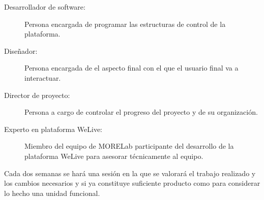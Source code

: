 \documentclass{DeustoFDP}
\begin{document}
\begin{description}
    \item[Desarrollador de software:] Persona encargada de programar las estructuras de control de la plataforma.
    \item[Diseñador:] Persona encargada de el aspecto final con el que el usuario final va a interactuar.
    \item[Director de proyecto:] Persona a cargo de controlar el progreso del proyecto y de su organización.
    \item[Experto en plataforma WeLive:] Miembro del equipo de MORELab participante del desarrollo de la plataforma WeLive para asesorar técnicamente al equipo.
\end{description}

Cada dos semanas se hará una sesión en la que se valorará el trabajo realizado y los cambios necesarios y si ya constituye suficiente producto como para considerar lo hecho una unidad funcional.
\end{document}
